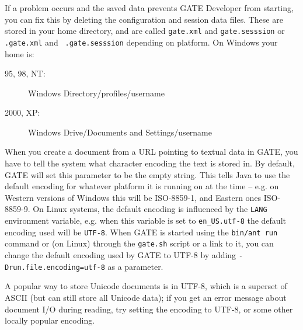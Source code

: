 If a problem occurs and the saved data prevents GATE Developer from
starting, you can fix this by deleting the configuration and session
data files. These are stored in your home directory, and are called
{\tt gate.xml} and {\tt gate.sesssion} or {\tt .gate.xml} and {\tt
.gate.sesssion} depending on platform.  On Windows your home is:
\begin{description}
\item[95, 98, NT:] Windows Directory/profiles/username
\item[2000, XP:] Windows Drive/Documents and Settings/username
\end{description}



When you create a document from a URL pointing to textual data
in GATE, you have to tell the system what character encoding the text is
stored in. By default, GATE will set this parameter to be the empty string.
This tells Java to use the default encoding for whatever platform it is
running on at the time -- e.g. on Western versions of Windows this will be
ISO-8859-1, and Eastern ones ISO-8859-9. On Linux systems, the default 
encoding is influenced by the \texttt{LANG} environment variable, e.g.
when this variable is set to \texttt{en\_US.utf-8} the default encoding used
will be \texttt{UTF-8}. When GATE is started using the \texttt{bin/ant run} 
command or (on Linux) through the \texttt{gate.sh} script or a link to it,
you can change the default encoding used by GATE to UTF-8 by adding 
\texttt{-Drun.file.encoding=utf-8} as a parameter.

A popular way to store Unicode
documents is in UTF-8, which is a superset of ASCII (but can still store all
Unicode data); if you get
an error message about document I/O during reading, try setting the encoding
to UTF-8, or some other locally popular encoding.


